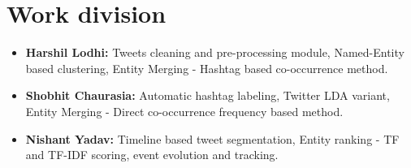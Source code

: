 \chapter{Work division}
\begin{itemize}
\item \textbf{Harshil Lodhi:} Tweets cleaning and pre-processing module, Named-Entity based clustering, Entity Merging - Hashtag based co-occurrence method.
\item \textbf{Shobhit Chaurasia:} Automatic hashtag labeling, Twitter LDA variant, Entity Merging - Direct co-occurrence frequency based method.
\item \textbf{Nishant Yadav:} Timeline based tweet segmentation, Entity ranking - TF and TF-IDF scoring, event evolution and tracking.
\end{itemize}